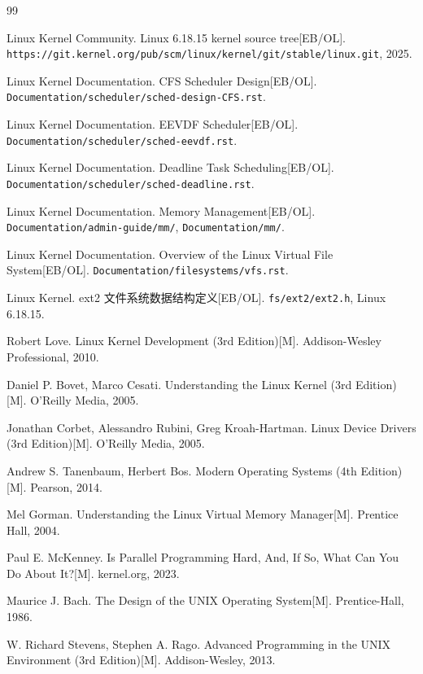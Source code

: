 \documentclass[a4paper]{article}
\begin{document}
\begin{thebibliography}{99}

 Linux Kernel Community. Linux 6.18.15 kernel source tree[EB/OL]. \texttt{https://git.kernel.org/pub/scm/linux/kernel/git/stable/linux.git}, 2025.

 Linux Kernel Documentation. CFS Scheduler Design[EB/OL]. \texttt{Documentation/scheduler/sched-design-CFS.rst}.

 Linux Kernel Documentation. EEVDF Scheduler[EB/OL]. \texttt{Documentation/scheduler/sched-eevdf.rst}.

 Linux Kernel Documentation. Deadline Task Scheduling[EB/OL]. \texttt{Documentation/scheduler/sched-deadline.rst}.

 Linux Kernel Documentation. Memory Management[EB/OL]. \texttt{Documentation/admin-guide/mm/}, \texttt{Documentation/mm/}.

 Linux Kernel Documentation. Overview of the Linux Virtual File System[EB/OL]. \texttt{Documentation/filesystems/vfs.rst}.

 Linux Kernel. ext2 文件系统数据结构定义[EB/OL]. \texttt{fs/ext2/ext2.h}, Linux 6.18.15.

 Robert Love. Linux Kernel Development (3rd Edition)[M]. Addison-Wesley Professional, 2010.

 Daniel P. Bovet, Marco Cesati. Understanding the Linux Kernel (3rd Edition)[M]. O'Reilly Media, 2005.

 Jonathan Corbet, Alessandro Rubini, Greg Kroah-Hartman. Linux Device Drivers (3rd Edition)[M]. O'Reilly Media, 2005.

 Andrew S. Tanenbaum, Herbert Bos. Modern Operating Systems (4th Edition)[M]. Pearson, 2014.

 Mel Gorman. Understanding the Linux Virtual Memory Manager[M]. Prentice Hall, 2004.

 Paul E. McKenney. Is Parallel Programming Hard, And, If So, What Can You Do About It?[M]. kernel.org, 2023.

 Maurice J. Bach. The Design of the UNIX Operating System[M]. Prentice-Hall, 1986.

 W. Richard Stevens, Stephen A. Rago. Advanced Programming in the UNIX Environment (3rd Edition)[M]. Addison-Wesley, 2013.


\end{thebibliography}
\end{document}
